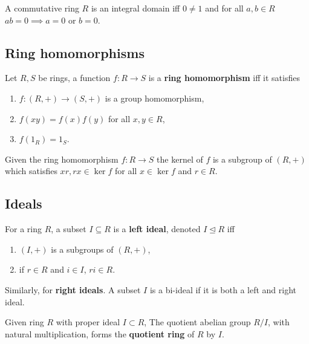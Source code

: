 \documentclass[../Year2.tex]{subfiles}
\begin{document}
\begin{definition}
    A commutative ring $R$ is an integral domain iff $0\neq1$ and for all $a,b\in R$ $ab=0\implies a=0$ or $b=0$.
\end{definition}

\subsection{Ring homomorphisms}

\begin{definition}
    Let $R,S$ be rings, a function $f:R\rightarrow S$ is a \textbf{ring homomorphism} iff it satisfies \begin{enumerate}
        \item $f:(R,+)\rightarrow (S,+)$ is a group homomorphism,
        \item $f(xy)=f(x)f(y)$ for all $x,y\in R$,
        \item $f(1_R)=1_S$.
    \end{enumerate}
\end{definition}

\begin{lemma}
    Given the ring homomorphism $f:R\rightarrow S$ the kernel of $f$ is a subgroup of $(R,+)$ which satisfies $xr,rx\in\ker f$ for all $x\in \ker f$ and $r\in R$.
\end{lemma}

\subsection{Ideals}

\begin{definition}[Ideal]
    For a ring $R$, a subset $I\subseteq R$ is a \textbf{left ideal}, denoted $I\unlhd R$ iff \begin{enumerate}
        \item $(I,+)$ is a subgroups of $(R,+)$,
        \item if $r\in R$ and $i\in I$, $ri\in R$.
    \end{enumerate} Similarly, for \textbf{right ideals}. A subset $I$ is a bi-ideal if it is both a left and right ideal.
\end{definition}

\begin{definition}
    Given ring $R$ with proper ideal $I\subset R$, The quotient abelian group $R/I$, with natural multiplication, forms the \textbf{quotient ring} of $R$ by $I$.
\end{definition}
\end{document}
